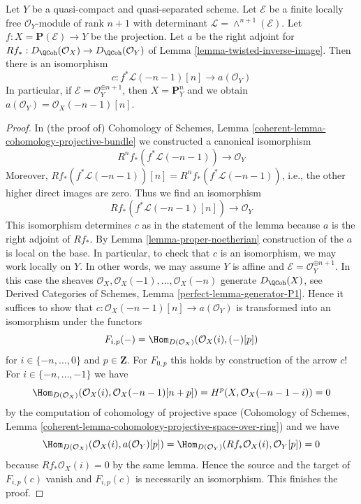 \begin{lemma}
\label{lemma-upper-shriek-P1}
Let $Y$ be a quasi-compact and quasi-separated scheme.
Let $\mathcal{E}$ be a finite locally
free $\mathcal{O}_Y$-module of rank $n + 1$ with determinant
$\mathcal{L} = \wedge^{n + 1}(\mathcal{E})$.
Let $f : X = \mathbf{P}(\mathcal{E}) \to Y$ be the projection.
Let $a$ be the right adjoint for
$Rf_* : D_\QCoh(\mathcal{O}_X) \to D_\QCoh(\mathcal{O}_Y)$ of
Lemma \ref{lemma-twisted-inverse-image}.
Then there is an isomorphism
$$
c : f^*\mathcal{L}(-n - 1)[n] \longrightarrow a(\mathcal{O}_Y)
$$
In particular, if $\mathcal{E} = \mathcal{O}_Y^{\oplus n + 1}$, then
$X = \mathbf{P}^n_Y$ and we obtain
$a(\mathcal{O}_Y) = \mathcal{O}_X(-n - 1)[n]$.
\end{lemma}

\begin{proof}
In (the proof of) Cohomology of Schemes, Lemma
\ref{coherent-lemma-cohomology-projective-bundle}
we constructed a canonical isomorphism
$$
R^nf_*(f^*\mathcal{L}(-n - 1)) \longrightarrow \mathcal{O}_Y
$$
Moreover, $Rf_*(f^*\mathcal{L}(-n - 1))[n] = R^nf_*(f^*\mathcal{L}(-n - 1))$,
i.e., the other higher direct images are zero. Thus we find an isomorphism
$$
Rf_*(f^*\mathcal{L}(-n - 1)[n]) \longrightarrow \mathcal{O}_Y
$$
This isomorphism determines $c$ as in the statement of the lemma
because $a$ is the right adjoint of $Rf_*$.
By Lemma \ref{lemma-proper-noetherian} construction of the $a$
is local on the base. In particular, to check that
$c$ is an isomorphism, we may work locally on $Y$.
In other words, we may assume $Y$ is affine and
$\mathcal{E} = \mathcal{O}_Y^{\oplus n + 1}$.
In this case the sheaves $\mathcal{O}_X, \mathcal{O}_X(-1), \ldots,
\mathcal{O}_X(-n)$ generate $D_\QCoh(X)$, see
Derived Categories of Schemes, Lemma \ref{perfect-lemma-generator-P1}.
Hence it suffices to show that
$c : \mathcal{O}_X(-n - 1)[n] \to a(\mathcal{O}_Y)$
is transformed into an isomorphism under the functors
$$
F_{i, p}(-) = \Hom_{D(\mathcal{O}_X)}(\mathcal{O}_X(i), (-)[p])
$$
for $i \in \{-n, \ldots, 0\}$ and $p \in \mathbf{Z}$.
For $F_{0, p}$ this holds by construction of the arrow $c$!
For $i \in \{-n, \ldots, -1\}$ we have
$$
\Hom_{D(\mathcal{O}_X)}(\mathcal{O}_X(i), \mathcal{O}_X(-n - 1)[n + p]) =
H^p(X, \mathcal{O}_X(-n - 1 - i)) = 0
$$
by the computation of cohomology of projective space
(Cohomology of Schemes, Lemma
\ref{coherent-lemma-cohomology-projective-space-over-ring})
and we have
$$
\Hom_{D(\mathcal{O}_X)}(\mathcal{O}_X(i), a(\mathcal{O}_Y)[p]) =
\Hom_{D(\mathcal{O}_Y)}(Rf_*\mathcal{O}_X(i), \mathcal{O}_Y[p]) = 0
$$
because $Rf_*\mathcal{O}_X(i) = 0$ by the same lemma.
Hence the source and the target of $F_{i, p}(c)$ vanish
and $F_{i, p}(c)$ is necessarily an isomorphism.
This finishes the proof.
\end{proof}